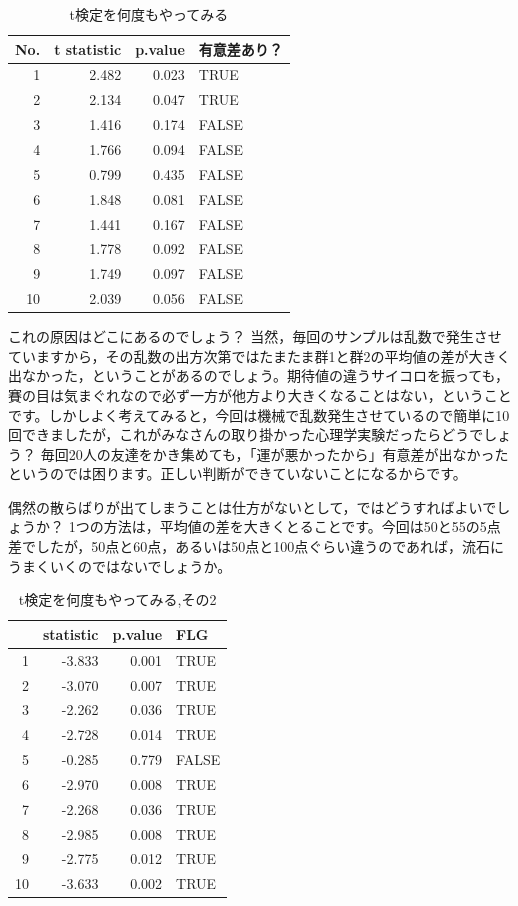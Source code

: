 \documentclass{ltjsarticle}
\begin{document}
\begin{table}[ht]
	\centering
	\caption{t検定を何度もやってみる}
	\begin{tabular}{rrrl}
		\hline
		No. & t statistic & p.value & 有意差あり？ \\
		\hline
		1   & 2.482       & 0.023   & TRUE   \\
		2   & 2.134       & 0.047   & TRUE   \\
		3   & 1.416       & 0.174   & FALSE  \\
		4   & 1.766       & 0.094   & FALSE  \\
		5   & 0.799       & 0.435   & FALSE  \\
		6   & 1.848       & 0.081   & FALSE  \\
		7   & 1.441       & 0.167   & FALSE  \\
		8   & 1.778       & 0.092   & FALSE  \\
		9   & 1.749       & 0.097   & FALSE  \\
		10  & 2.039       & 0.056   & FALSE  \\
		\hline
	\end{tabular}
	\label{tbl::19_03}
\end{table}

これの原因はどこにあるのでしょう？ 当然，毎回のサンプルは乱数で発生させていますから，その乱数の出方次第ではたまたま群1と群2の平均値の差が大きく出なかった，ということがあるのでしょう。期待値の違うサイコロを振っても，賽の目は気まぐれなので必ず一方が他方より大きくなることはない，ということです。しかしよく考えてみると，今回は機械で乱数発生させているので簡単に10回できましたが，これがみなさんの取り掛かった心理学実験だったらどうでしょう？ 毎回20人の友達をかき集めても，「運が悪かったから」有意差が出なかったというのでは困ります。正しい判断ができていないことになるからです。

偶然の散らばりが出てしまうことは仕方がないとして，ではどうすればよいでしょうか？ 1つの方法は，平均値の差を大きくとることです。今回は50と55の5点差でしたが，50点と60点，あるいは50点と100点ぐらい違うのであれば，流石にうまくいくのではないでしょうか。


\begin{table}[ht]
	\centering
	\caption{t検定を何度もやってみる,その2}
	\begin{tabular}{rrrl}
		\hline
		   & statistic & p.value & FLG   \\
		\hline
		1  & -3.833    & 0.001   & TRUE  \\
		2  & -3.070    & 0.007   & TRUE  \\
		3  & -2.262    & 0.036   & TRUE  \\
		4  & -2.728    & 0.014   & TRUE  \\
		5  & -0.285    & 0.779   & FALSE \\
		6  & -2.970    & 0.008   & TRUE  \\
		7  & -2.268    & 0.036   & TRUE  \\
		8  & -2.985    & 0.008   & TRUE  \\
		9  & -2.775    & 0.012   & TRUE  \\
		10 & -3.633    & 0.002   & TRUE  \\
		\hline
	\end{tabular}
	\label{tbl::19_04}
\end{table}
\end{document}
